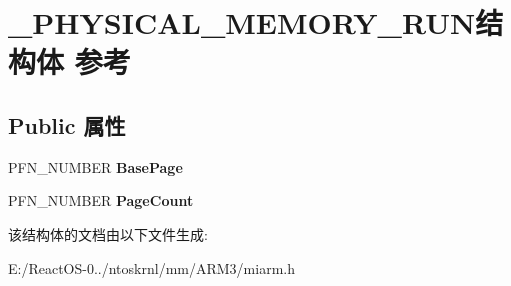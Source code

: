 \hypertarget{struct___p_h_y_s_i_c_a_l___m_e_m_o_r_y___r_u_n}{}\section{\+\_\+\+P\+H\+Y\+S\+I\+C\+A\+L\+\_\+\+M\+E\+M\+O\+R\+Y\+\_\+\+R\+U\+N结构体 参考}
\label{struct___p_h_y_s_i_c_a_l___m_e_m_o_r_y___r_u_n}
\subsection*{Public 属性}
\begin{DoxyCompactItemize}
\item 
\mbox{\label{struct___p_h_y_s_i_c_a_l___m_e_m_o_r_y___r_u_n_ad06d37039fd15159dc54623740739841}} 
P\+F\+N\+\_\+\+N\+U\+M\+B\+ER {\bfseries Base\+Page}
\item 
\mbox{\label{struct___p_h_y_s_i_c_a_l___m_e_m_o_r_y___r_u_n_a618d383974f17edc439b31a92c5638c8}} 
P\+F\+N\+\_\+\+N\+U\+M\+B\+ER {\bfseries Page\+Count}
\end{DoxyCompactItemize}


该结构体的文档由以下文件生成\+:\begin{DoxyCompactItemize}
\item 
E\+:/\+React\+O\+S-\/0../ntoskrnl/mm/\+A\+R\+M3/miarm.\+h\end{DoxyCompactItemize}
